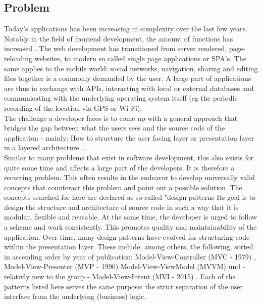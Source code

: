 \subsection{Problem}
\label{subsec:problem}

Today's applications has been increasing in complexity over the last few years. Notably in the field of frontend development, the amount of functions has increased 
\cite{kevin2018}. 
The web development has transitioned from server rendered, 
page-reloading websites, to modern so called single page applications or SPA's.
The same applies to the mobile world: social networks, navigation, sharing and editing files together is a commonly demanded by the user.
A large part of applications are thus in exchange with APIs, interacting with local or external databases
and communicating with the underlying operating system itself (eg the periodic recording of the location via GPS or Wi-Fi).
\\
The challenge a developer faces is to come up with a general approach that bridges the gap between what the users sees and the source code of 
the application - mainly: How to structure the user facing layer or presentation layer in a layered architecture. 
\cite{guru99ntier,softwareArchitecturePatternsMark2015}. 
\\
Similar to many problems that exist in software development, this also exists for quite some time and affects a large part of the developers. 
It is therefore a recurring problem. This often results in the endeavor to develop universally valid concepts that counteract this problem and point out a 
possible solution. The concepts searched for here are declared as so-called "design patterns
\cite{techterms2016design-pattern}
Its goal is to design the structure and architecture of source code in such a way that it is modular, flexible and
reusable. At the same time, the developer is urged to follow a scheme and work consistently. This promotes quality and
maintainability of the application. Over time, many design patterns have evolved for structuring code within the presentation layer. 
These include, among others, the following, sorted in ascending order by year of publication: Model-View-Controller (MVC - 1979) 
\cite{wikipediaMvc}, 
Model-View-Presenter (MVP - 1990) 
\cite{wikipediaMvp} 
Model-View-ViewModel (MVVM) 
\cite{blogMsdnMvvm} und - relativly
new to the group - Model-View-Intent (MVI - 2015) 
\cite{youtubeAndreStaltzUserFunction}. 
Each of the patterns listed here serves the same purpose: the strict separation of the user interface from the underlying (business) logic.
